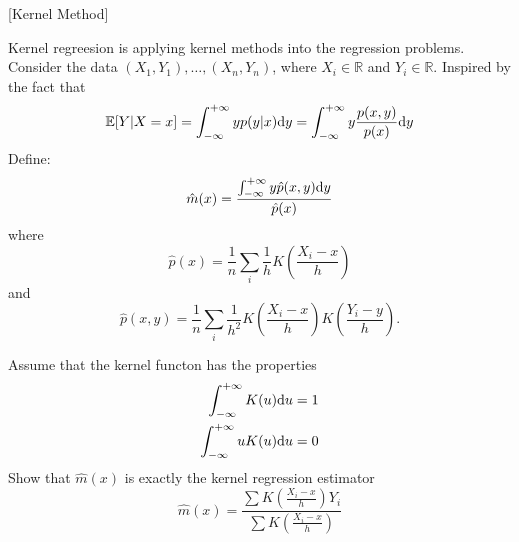 \item {} [Kernel Method]

Kernel regreesion is applying kernel methods into the regression problems. Consider the data $\left(X_{1}, Y_{1}\right), \ldots,\left(X_{n}, Y_{n}\right)$, where $X_{i} \in \mathbb{R}$ and $Y_{i} \in \mathbb{R}$. Inspired by the fact that
$$\mathbb{E}[Y | X=x]=\int_{-\infty}^{+\infty} y p(y|x) \mathrm{d}y=\int_{-\infty}^{+\infty} y \dfrac{p(x, y)}{p(x)} \mathrm{d}y$$
Define:
$$\hat{m}(x)=\dfrac{\int_{-\infty}^{+\infty} y \hat{p}(x, y) \mathrm{d}y}{\hat{p}(x)}$$
where
$$\hat{p}(x)=\dfrac{1}{n} \sum_{i} \dfrac{1}{h} K\left(\frac{X_{i}-x}{h}\right)$$
and
$$\hat{p}(x, y)= \frac{1}{n} \sum_{i} \frac{1}{h^{2}} K\left(\frac{X_{i}-x}{h}\right) K\left(\frac{Y_{i}-y}{h}\right) .$$

Assume that the kernel functon has the properties
\begin{align*}
\int_{-\infty}^{+\infty} K(u) \mathrm{d}u &= 1 \\
\int_{-\infty}^{+\infty} uK(u) \mathrm{d}u &= 0
\end{align*}
Show that $\hat{m}(x)$ is exactly the kernel regression estimator
$$\hat{m}(x) = \dfrac{\sum K\left(\frac{X_{i}-x}{h}\right) Y_{i}}{\sum K\left(\frac{X_{i}-x}{h}\right)}$$

\solution














\newpage